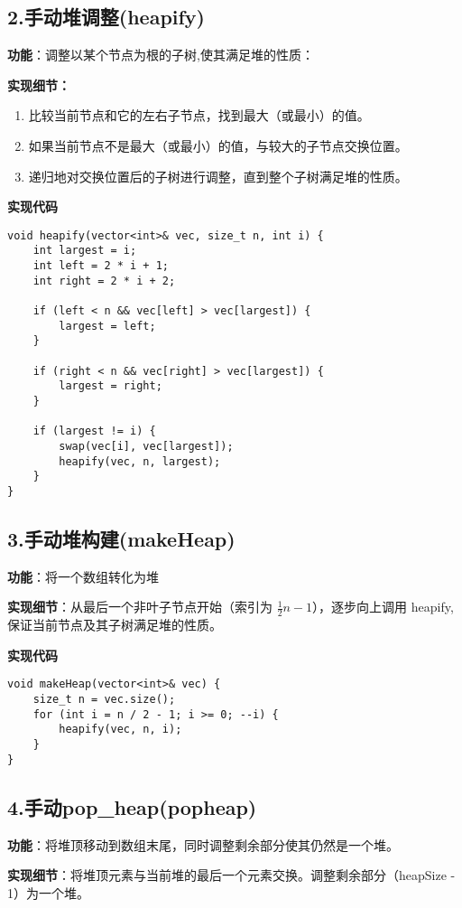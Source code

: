 \documentclass[a4paper]{article}
\begin{document}
\subsection*{2.手动堆调整(heapify)}
\textbf{功能}：调整以某个节点为根的子树,使其满足堆的性质：

\textbf{实现细节：}
\begin{enumerate}
    \item 比较当前节点和它的左右子节点，找到最大（或最小）的值。
    \item 如果当前节点不是最大（或最小）的值，与较大的子节点交换位置。
    \item 递归地对交换位置后的子树进行调整，直到整个子树满足堆的性质。
\end{enumerate}

\textbf{实现代码}
\begin{lstlisting}
void heapify(vector<int>& vec, size_t n, int i) {
    int largest = i;
    int left = 2 * i + 1;
    int right = 2 * i + 2;

    if (left < n && vec[left] > vec[largest]) {
        largest = left;
    }

    if (right < n && vec[right] > vec[largest]) {
        largest = right;
    }

    if (largest != i) {
        swap(vec[i], vec[largest]);
        heapify(vec, n, largest);
    }
}
\end{lstlisting}

\subsection*{3.手动堆构建(makeHeap)}
\textbf{功能}：将一个数组转化为堆

\textbf{实现细节}：从最后一个非叶子节点开始（索引为 $\frac{1}{2}n-1$），逐步向上调用 heapify,保证当前节点及其子树满足堆的性质。

\textbf{实现代码}
\begin{lstlisting}
void makeHeap(vector<int>& vec) {
    size_t n = vec.size();
    for (int i = n / 2 - 1; i >= 0; --i) {
        heapify(vec, n, i);
    }
}
\end{lstlisting}

\subsection*{4.手动pop\_heap(popheap)}
\textbf{功能}：将堆顶移动到数组末尾，同时调整剩余部分使其仍然是一个堆。

\textbf{实现细节}：将堆顶元素与当前堆的最后一个元素交换。调整剩余部分（heapSize - 1）为一个堆。
\end{document}
